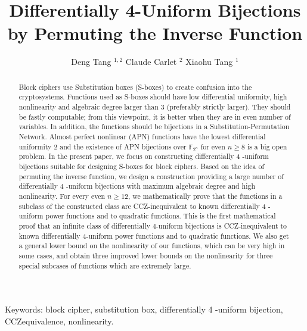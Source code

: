 \documentclass[10pt]{article}
\title{Differentially 4-Uniform Bijections by Permuting the Inverse Function }
\author{Deng Tang ${ }^{1,2}$ Claude Carlet ${ }^{2}$ Xiaohu Tang ${ }^{1}$}
\date{}
\begin{document}
\maketitle
\captionsetup{singlelinecheck=false}


\begin{abstract}
Block ciphers use Substitution boxes (S-boxes) to create confusion into the cryptosystems. Functions used as S-boxes should have low differential uniformity, high nonlinearity and algebraic degree larger than 3 (preferably strictly larger). They should be fastly computable; from this viewpoint, it is better when they are in even number of variables. In addition, the functions should be bijections in a Substitution-Permutation Network. Almost perfect nonlinear (APN) functions have the lowest differential uniformity 2 and the existence of APN bijections over $\mathbb{F}_{2^{n}}$ for even $n \geq 8$ is a big open problem. In the present paper, we focus on constructing differentially 4 -uniform bijections suitable for designing S-boxes for block ciphers. Based on the idea of permuting the inverse function, we design a construction providing a large number of differentially 4 -uniform bijections with maximum algebraic degree and high nonlinearity. For every even $n \geq 12$, we mathematically prove that the functions in a subclass of the constructed class are CCZ-inequivalent to known differentially 4 -uniform power functions and to quadratic functions. This is the first mathematical proof that an infinite class of differentially 4-uniform bijections is CCZ-inequivalent to known differentially 4-uniform power functions and to quadratic functions. We also get a general lower bound on the nonlinearity of our functions, which can be very high in some cases, and obtain three improved lower bounds on the nonlinearity for three special subcases of functions which are extremely large.
\end{abstract}

Keywords: block cipher, substitution box, differentially 4 -uniform bijection, CCZequivalence, nonlinearity.
\end{document}
